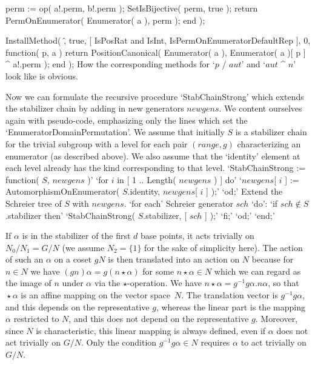     perm := op( a!.perm, b!.perm );
    SetIsBijective( perm, true );
    return PermOnEnumerator( Enumerator( a ), perm );
end );

InstallMethod( \^, true,
        [ IsPosRat and IsInt, IsPermOnEnumeratorDefaultRep ], 0,
    function( p, a )
    return PositionCanonical( Enumerator( a ),
                   Enumerator( a )[ p ] ^ a!.perm );
end );
\endtt
How the corresponding  methods for `$p$ /  $aut$' and `$aut$  ^ $n$' look
like is obvious.

Now we  can  formulate  the recursive procedure   `StabChainStrong' which
extends  the stabilizer chain by adding  in new  generators $newgens$. We
content  ourselves again   with pseudo-code, emphasizing  only  the lines
which set the `EnumeratorDomainPermutation'. We assume that initially $S$
is a stabilizer chain for the trivial subgroup with a level for each pair
$(range,g)$ characterizing an enumerator  (as  described above). We  also
assume that  the `identity'  element at each  level already  has the kind
corresponding to that level.
\bigskip
{\obeylines\frenchspacing
`StabChainStrong := function( $S$, $newgens$ )'
\quad `for $i$  in [ 1 .. Length( $newgens$ ) ]  do'
\qquad `$newgens$[ $i$ ] := AutomorphismOnEnumerator( $S$.identity,
\qquad\quad $newgens$[ $i$ ] );'
\quad `od;'
\quad Extend the Schreier tree of $S$ with $newgens$.
\quad `for each' Schreier generator $sch$ `do':
\qquad `if $sch \notin S$.stabilizer  then'
\qquad\quad `StabChainStrong( $S$.stabilizer, [ $sch$ ] );'
\qquad `fi;'
\quad `od;'
`end;'}

\null

If $\alpha$ is  in the stabilizer of the  first $d$ base  points, it acts
trivially on   $N_0/N_1 = G/N$  (we  assume $N_2=\{1\}$ for  the  sake of
simplicity here). The action of such an $\alpha$ on  a coset $gN$ is then
translated into an action on $N$ because for $n\in N$ we have $(gn)\alpha
=  g(n\star\alpha)$ for some $n\star\alpha\in  N$  which we can regard as
the image   of $n$  under $\alpha$  via  the  $\star$-operation.  We have
$n\star\alpha =  g^{-1}g\alpha.n\alpha$,  so  that ${}\star\alpha$ is  an
affine mapping on the    vector  space~$N$. The translation    vector  is
$g^{-1}g\alpha$, and this depends on  the representative $g$, whereas the
linear part is the mapping $\alpha$ restricted to  $N$, and this does not
depend on the representative  $g$. Moreover, since $N$ is characteristic,
this  linear mapping is always   defined, even if   $\alpha$ does not act
trivially on $G/N$.    Only the condition $g^{-1}g\alpha\in  N$  requires
$\alpha$ to act trivially on $G/N$.

